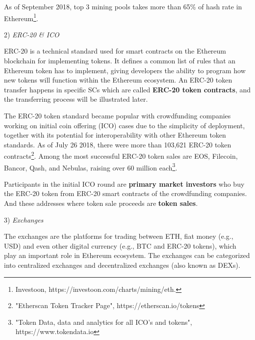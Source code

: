 As of September 2018, top $3$ mining pools takes more than 65\% of hash rate in Ethereum\footnote{Investoon, https://investoon.com/charts/mining/eth.}.

2) \emph{ERC-20 \& ICO}

ERC-20 is a technical standard used for smart contracts on the Ethereum blockchain for implementing tokens\cite{erc-20-wiki}.  It defines a common list of rules that an Ethereum token has to implement, giving developers the ability to program how new tokens will function within the Ethereum ecosystem. An ERC-20 token transfer happens in specific SCs which are called \textbf{ERC-20 token contracts}, and the transferring process will be illustrated later. 

The ERC-20 token standard became popular with crowdfunding companies working on initial coin offering (ICO) cases due to the simplicity of deployment, together with its potential for interoperability with other Ethereum token standards\cite{erc-20}. As of July 26 2018, there were more than 103,621 ERC-20 token contracts\footnote{"Etherscan Token Tracker Page", https://etherscan.io/tokens}. Among the most successful ERC-20 token sales are EOS, Filecoin, Bancor, Qash, and Nebulas, raising over 60 million each\footnote{"Token Data, data and analytics for all ICO's and tokens", https://www.tokendata.io}.

Participants in the initial ICO round are \textbf{primary market investors} who buy the ERC-20 token from ERC-20 smart contracts of the crowdfunding companies. And these addresses where token sale proceeds are \textbf{token sales}.

3) \emph{Exchanges}

The exchanges are the platforms for trading between ETH, fiat money (e.g., USD) and even other digital currency (e.g., BTC and ERC-20 tokens), which play an important role in Ethereum ecosystem. The exchanges can be categorized into centralized exchanges and decentralized exchanges (also known as DEXs).




